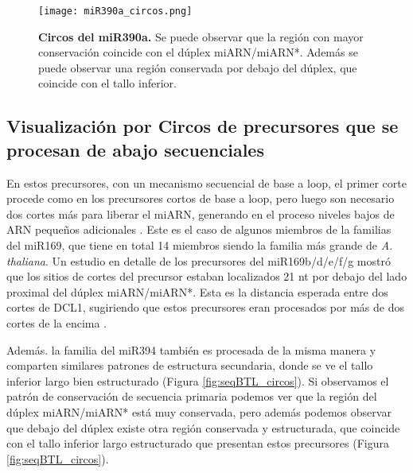 \begin{figure}[htbp!] 
    \centering    
    \texttt{[image: miR390a\_circos.png]}
    \caption[Circos del miR172a]{
    \textbf{Circos del miR390a.}
    Se puede observar que la región con mayor conservación coincide con el dúplex miARN/miARN*.
    Además se puede observar una región conservada por debajo del dúplex, que coincide con el tallo inferior.
    }
     \label{fig:miR390a_circos}
\end{figure}

\subsection{Visualización por Circos de precursores que se procesan de abajo secuenciales}

En estos precursores, con un mecanismo secuencial de base a loop, el primer corte procede como en los precursores cortos de base a loop, pero luego son necesario dos cortes más para liberar el miARN, generando en el proceso niveles bajos de ARN pequeños adicionales \citep{Bologna2013}.
Este es el caso de algunos miembros de la  familias del miR169, que tiene en total 14 miembros siendo la familia más grande de \textit{A. thaliana}.
Un estudio en detalle de los precursores del miR169b/d/e/f/g mostró que los sitios de cortes del precursor estaban localizados 21 nt por debajo del lado proximal del dúplex miARN/miARN*.
Esta es la distancia esperada entre dos cortes de DCL1, sugiriendo que estos precursores eran procesados por más de dos cortes de la encima \citep{Bologna2013}.

Además. la familia del miR394 también es procesada de la misma manera y comparten similares patrones de estructura secundaria, donde se ve el tallo inferior largo bien estructurado (Figura \ref{fig:seqBTL_circos}).
Si observamos el patrón de conservación de secuencia primaria podemos ver que la región del dúplex miARN/miARN* está muy conservada, pero además podemos observar que debajo del dúplex existe otra región conservada y estructurada, que coincide con el tallo inferior largo estructurado que presentan estos precursores (Figura \ref{fig:seqBTL_circos}).


